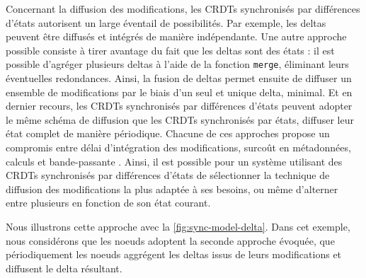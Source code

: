 Concernant la diffusion des modifications, les \acp{CRDT} synchronisés par différences d'états autorisent un large éventail de possibilités.
Par exemple, les deltas peuvent être diffusés et intégrés de manière indépendante.
Une autre approche possible consiste à tirer avantage du fait que les deltas sont des états : il est possible d'agréger plusieurs deltas à l'aide de la fonction \texttt{merge}, éliminant leurs éventuelles redondances.
Ainsi, la fusion de deltas permet ensuite de diffuser un ensemble de modifications par le biais d'un seul et unique delta, minimal.
Et en dernier recours, les \acp{CRDT} synchronisés par différences d'états peuvent adopter le même schéma de diffusion que les \acp{CRDT} synchronisés par états, \ie diffuser leur état complet de manière périodique.
Chacune de ces approches propose un compromis entre délai d'intégration des modifications, surcoût en métadonnées, calculs et bande-passante \cite{enes2019}.
Ainsi, il est possible pour un système utilisant des \acp{CRDT} synchronisés par différences d'états de sélectionner la technique de diffusion des modifications la plus adaptée à ses besoins, ou même d'alterner entre plusieurs en fonction de son état courant.

Nous illustrons cette approche avec la \autoref{fig:sync-model-delta}.
Dans cet exemple, nous considérons que les noeuds adoptent la seconde approche évoquée, \ie que périodiquement les noeuds aggrégent les deltas issus de leurs modifications et diffusent le delta résultant.

